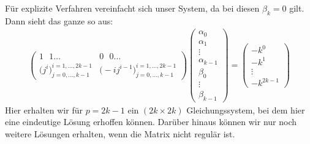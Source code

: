 \begin{solution}
Für explizite Verfahren vereinfacht sich unser System, da bei diesen $\beta_k = 0$ gilt.
Dann sieht das ganze so aus:
\begin{align*}
  \left(\begin{array}{c|c}
    1 \text{ }1\dots & 0\text{ } 0 \dots \\
    \hline
    \bigg( j^i\bigg)_{j=0,\dots,k-1}^{i=1,\dots,2k-1} & \bigg( -ij^{i-1}\bigg)_{j=0,\dots,k-1}^{i=1,\dots,2k-1}
  \end{array}\right)
  \left(\begin{array}{c}
    \alpha_0 \\
    \alpha_1 \\
    \vdots \\
    \alpha_{k-1} \\
    \beta_0 \\
    \vdots \\
    \beta_{k-1}
  \end{array}\right) =
  \left(\begin{array}{c}
    -k^0 \\
    -k^1 \\
    \vdots \\
    -k^{2k-1}
  \end{array}\right)
\end{align*}
Hier erhalten wir für $p = 2k - 1$ ein $(2k \times 2k)$ Gleichungssystem,
bei dem hier eine eindeutige Lösung erhoffen können. Darüber hinaus können wir
nur noch weitere Lösungen erhalten, wenn die Matrix nicht regulär ist.
\end{solution}
